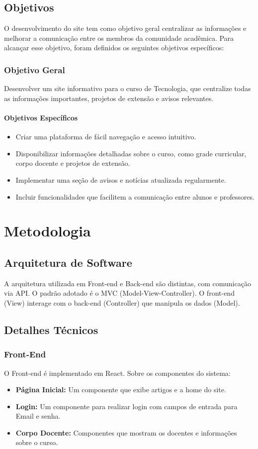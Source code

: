 \documentclass[a4paper,12pt]{report}
\begin{document}
\section{Objetivos}
O desenvolvimento do site tem como objetivo geral centralizar as informações e melhorar a comunicação entre os membros da comunidade acadêmica. Para alcançar esse objetivo, foram definidos os seguintes objetivos específicos:

\subsection{Objetivo Geral}
Desenvolver um site informativo para o curso de Tecnologia, que centralize todas as informações importantes, projetos de extensão e avisos relevantes. 

\subsubsection{Objetivos Específicos}
\begin{itemize}
    \item Criar uma plataforma de fácil navegação e acesso intuitivo.
    \item Disponibilizar informações detalhadas sobre o curso, como grade curricular, corpo docente e projetos de extensão.
    \item Implementar uma seção de avisos e notícias atualizada regularmente.
    \item Incluir funcionalidades que facilitem a comunicação entre alunos e professores.
\end{itemize}

\chapter{Metodologia}
\section{Arquitetura de Software} 
A arquitetura utilizada em Front-end e Back-end são distintas, com comunicação via API. O padrão adotado é o MVC (Model-View-Controller). O front-end (View) interage com o back-end (Controller) que manipula os dados (Model). 

\section{Detalhes Técnicos}
\subsection{Front-End} 
O Front-end é implementado em React. 
Sobre os componentes do sistema: 
\begin{itemize} 
    \item \textbf{Página Inicial:} Um componente que exibe artigos e a home do site. 
    \item \textbf{Login:} Um componente para realizar login com campos de entrada para Email e senha. 
    \item \textbf{Corpo Docente:} Componentes que mostram os docentes e informações sobre o curso. 
\end{itemize}
\end{document}
